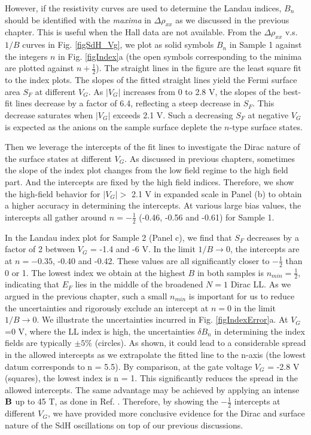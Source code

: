 However, if the resistivity curves are used to determine the Landau indices, $B_n$ should be identified with the \emph{maxima} in $\Delta\rho_{xx}$ as we discussed in the previous chapter. This is useful when the Hall data are not available. From the $\Delta\rho_{xx}$ v.s. $1/B$ curves in Fig. \ref{figSdH_Vg}, we plot as solid symbols $B_n$ in Sample 1 against the integers $n$ in Fig. \ref{figIndex}a
(the open symbols corresponding to the minima are plotted against $n+\frac12$). The straight lines in the figure are the least square fit to the index plots. The slopes of the fitted straight lines yield the Fermi surface area $S_F$ at different $V_G$. 
As $|V_G|$ increases from 0 to 2.8 V, the slopes of the best-fit lines 
decrease by a factor of 6.4, reflecting a steep decrease in $S_F$. 
This decrease saturates when $|V_G|$ exceeds 2.1 V. Such a decreasing $S_F$ at negative $V_G$ is expected as the anions on the sample surface deplete the $n$-type surface states.  

Then we leverage the intercepts of the fit lines to investigate the Dirac nature of the surface states at different $V_G$. As discussed in previous chapters, sometimes the slope of the index plot changes from the low field regime to the high field part. And the intercepts are fixed by the high field indices. Therefore, we show the high-field behavior for $|V_G|>$ 2.1 V in expanded scale in Panel (b) to obtain a higher accuracy in determining the intercepts. At various large bias values, the intercepts all gather around $n = -\frac12$ 
(-0.46, -0.56 and -0.61) for Sample 1. 

In the Landau index plot for Sample 2 (Panel c), we find that $S_F$ decreases by a factor
of 2 between $V_G$ = -1.4 and -6 V. In the limit $1/B\to 0$, the intercepts are at
$n= -0.35$, -0.40 and -0.42.  These values are all significantly closer to $-\frac12$ than 0 or 1.
The lowest index we obtain at the highest $B$ in both samples is $n_{min}=\frac12$, indicating that $E_F$ lies in the middle of the broadened $N=1$ Dirac LL. As we argued in the previous chapter, such a small $n_{min}$ is important for us to reduce the uncertainties and rigorously exclude an intercept at $n=0$ in the limit $1/B\to 0$. We illustrate the uncertainties incurred in Fig. \ref{figIndexError}a. At $V_G$=0 V, where the LL index is high, the uncertainties $\delta B_n$ in determining the index fields are typically $\pm5\%$ (circles). As shown, it could lead to a considerable spread in the allowed intercepts as we extrapolate the fitted line to the n-axis (the lowest datum corresponds to n = 5.5). By comparison, at the gate voltage $V_G$ = -2.8 V 
(squares), the lowest index is n = 1. This significantly reduces the spread in the allowed intercepts. The same advantage may be achieved by applying an intense $\bf B$ up to 45 T, as done in Ref. \cite{Xiong2012b}.
Therefore, by showing the $-\frac12$ intercepts at different $V_G$, we have provided more conclusive evidence for the Dirac and surface nature of the SdH oscillations on top of our previous discussions.

